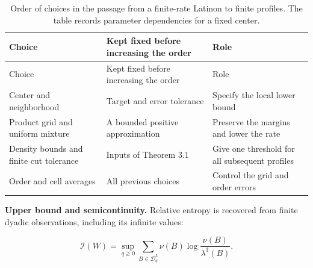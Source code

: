 \documentclass[english,11pt,a4paper]{article}
\begin{document}
\begin{longtable}[]{@{}
  >{\raggedright\arraybackslash}p{}
  >{\raggedright\arraybackslash}p{}
  >{\raggedright\arraybackslash}p{}@{}}
\caption{Order of choices in the passage from a finite-rate Latinon to finite profiles. The table records parameter dependencies for a fixed center.}\tabularnewline
\toprule\noalign{}
\begin{minipage}[b]{\linewidth}\raggedright
Choice
\end{minipage} & \begin{minipage}[b]{\linewidth}\raggedright
Kept fixed before increasing the order
\end{minipage} & \begin{minipage}[b]{\linewidth}\raggedright
Role
\end{minipage} \\
\midrule\noalign{}
\endfirsthead
\toprule\noalign{}
\begin{minipage}[b]{\linewidth}\raggedright
Choice
\end{minipage} & \begin{minipage}[b]{\linewidth}\raggedright
Kept fixed before increasing the order
\end{minipage} & \begin{minipage}[b]{\linewidth}\raggedright
Role
\end{minipage} \\
\midrule\noalign{}
\endhead
\bottomrule\noalign{}
\endlastfoot
Center and neighborhood & Target and error tolerance & Specify the local lower bound \\
Product grid and uniform mixture & A bounded positive approximation & Preserve the margins and lower the rate \\
Density bounds and finite cut tolerance & Inputs of Theorem 3.1 & Give one threshold for all subsequent profiles \\
Order and cell averages & All previous choices & Control the grid and order errors \\
\end{longtable}

\textbf{Upper bound and semicontinuity.} Relative entropy is recovered from finite dyadic observations, including its infinite values:

\nopagebreak[4]
\[\mathcal I(W)=\sup_{q\ge0}\sum_{B\in\mathcal D_q^3}
\nu(B)\log\frac{\nu(B)}{\lambda^3(B)}.\tag{8.1}\]
\end{document}

